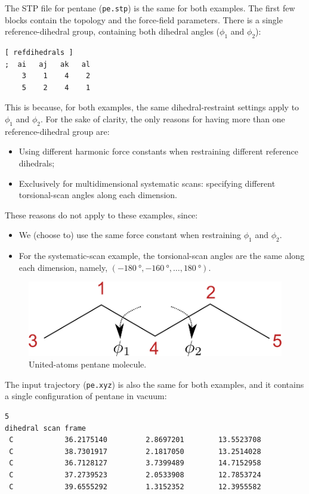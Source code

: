 \documentclass[10pt,a4paper,openany]{memoir}
\numberwithin{equation}{section}
\begin{document}
The STP file for pentane (\texttt{pe.stp}) is the same for both examples.
%
The first few blocks contain the topology and the force-field
parameters.
%
There is a single reference-dihedral group, containing both dihedral
angles ($\phi_1$ and $\phi_2$):

\begin{lstlisting}[language=gromacs]
[ refdihedrals ]
;  ai   aj   ak   al
    3    1    4    2
    5	 2    4	   1
\end{lstlisting}\vspace{2ex}\par

\noindent
This is because, for both examples, the same dihedral-restraint
settings apply to $\phi_1$ and $\phi_2$.
%
For the sake of clarity, the only reasons for having more than one
reference-dihedral group are:
\begin{itemize}
\item Using different harmonic force constants when restraining different reference dihedrals;
\item Exclusively for multidimensional systematic scans: specifying different torsional-scan angles along each dimension.
\end{itemize}
These reasons do not apply to these examples, since:
\begin{itemize}
\item We (choose to) use the same force constant when restraining
  $\phi_1$ and $\phi_2$.
\item For the systematic-scan example, the torsional-scan angles are
  the same along each dimension, namely, 
  $(\SI{-180}{\degree},\SI{-160}{\degree},\ldots,\SI{180}{\degree})$.
\end{itemize}

\begin{figure}[tb]
  \centering
  \includegraphics[width=.3\textwidth]{pentane}
  \caption{United-atoms pentane molecule.}
  \label{fig:pentane}
\end{figure}

The input trajectory (\texttt{pe.xyz}) is also the same for both
examples, and it contains a single configuration of pentane in vacuum:

\begin{lstlisting}[language=gromacs]
5
dihedral scan frame
 C            36.2175140         2.8697201        13.5523708
 C            38.7301917         2.1817050        13.2514028
 C            36.7128127         3.7399489        14.7152958
 C            37.2739523         2.0533908        12.7853724
 C            39.6555292         1.3152352        12.3955582
\end{lstlisting}\vspace{2ex}\par
\end{document}
